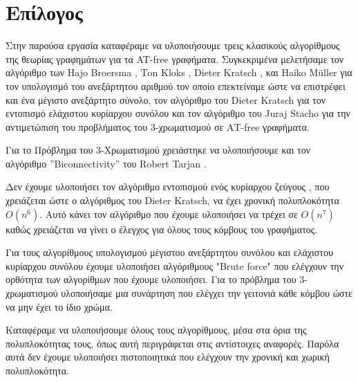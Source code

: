 \chapter{Επίλογος}
\label{ch:Conclusion}

Στην παρούσα εργασία καταφέραμε να υλοποιήσουμε τρεις κλασικούς αλγορίθμους της θεωρίας γραφημάτων για 
τα AT-free γραφήματα. Συγκεκριμένα μελετήσαμε τον αλγόριθμο των Ηajo Βroersma , Τon Κloks , Dieter Kratsch , και Ηaiko Μüller\cite{at-free-independent-sets} για τον υπολογισμό του ανεξάρτητου αριθμού τον οποίο επεκτείναμε ώστε να επιστρέφει και ένα μέγιστο ανεξάρτητο σύνολο, τον αλγόριθμο του Dieter Kratsch\cite{at-free-domination} για τον εντοπισμό ελάχιστου κυρίαρχου συνόλου και τον αλγόριθμο του Juraj Stacho\cite{at-free-3-colouring}  για την αντιμετώπιση του προβλήματος του 3-χρωματισμού σε ΑΤ-free γραφήματα.

Για το Πρόβλημα του 3-Χρωματισμού χρειάστηκε να υλοποιήσουμε και τον αλγόριθμο ”Biconnectivity” του Robert Tarjan \cite{tarjan-depth-first-search}.

Δεν έχουμε υλοποιήσει τον αλγόριθμο εντοπισμού ενός κυρίαρχου ζεύγους \cite{corneil-olariu-stewart-asteroidal-triple-free-graphs}, που χρειάζεται ώστε ο αλγόριθμος του Dieter Kratsch\cite{at-free-domination}, να έχει χρονική πολυπλοκότητα $O(n^6)$. Αυτό κάνει τον αλγόριθμο που έχουμε υλοποιήσει να τρέχει σε $O(n^7)$ καθώς χρειάζεται να γίνει ο έλεγχος για όλους τους κόμβους του γραφήματος. 

Για τους αλγορίθμους υπολογισμού μέγιστου ανεξάρτητου συνόλου και ελάχιστου κυρίαρχου συνόλου έχουμε υλοποιήσει αλγόριθμους "Brute force" που ελέγχουν την ορθότητα των αλγορίθμων που έχουμε υλοποιήσει. 
Για το πρόβλημα του 3-χρωματισμού υλοποιήσαμε μια συνάρτηση που ελέγχει την γειτονιά κάθε κόμβου ώστε να μην έχει το ίδιο χρώμα.

Καταφέραμε να υλοποιήσουμε όλους τους αλγορίθμους, μέσα στα όρια της πολυπλοκότητας τους, όπως αυτή περιγράφεται στις αντίστοιχες αναφορές. Παρόλα αυτά δεν έχουμε υλοποιήσει πιστοποιητικά που ελέγχουν την χρονική και χωρική πολυπλοκότητα.     